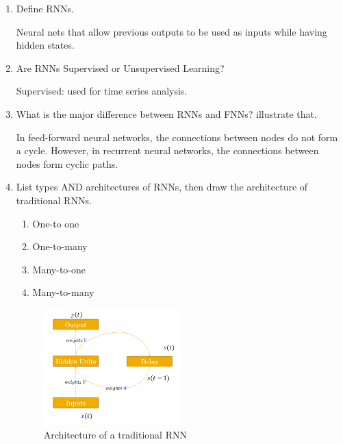 \documentclass[12pt]{article}
\newenvironment{QandA}{\begin{enumerate}[label=\bfseries\arabic*.]\bfseries}
{\end{enumerate}}
\newenvironment{answered}{\par\normalfont\color{Sepia}}{}
\begin{document}
\begin{QandA}
    \item Define RNNs.
    \begin{answered}
        Neural nets that allow previous outputs to be used as inputs while having hidden states.
    \end{answered}

    \item Are RNNs Supervised or Unsupervised Learning?
    \begin{answered}
        Supervised: used for time series analysis.
    \end{answered}

    \item What is the major difference between RNNs and FNNs? illustrate that.
    \begin{answered}
        In feed-forward neural networks, the connections between nodes do not form a cycle.  However,
        in recurrent neural networks, the connections between nodes form cyclic paths.
    \end{answered}

    \item List types AND architectures of RNNs, then draw the architecture of traditional RNNs.
    \begin{answered}
        \begin{enumerate}
            \item One-to one
            \item One-to-many
            \item Many-to-one
            \item Many-to-many
        \end{enumerate}
        \begin{figure}[h!]
            \centering
            \includegraphics[width=0.5\textwidth]{rnn.png}
            \caption{Architecture of a traditional RNN}
            \label{fig:rnn}
        \end{figure}


\end{answered}
\end{QandA}
\end{document}
